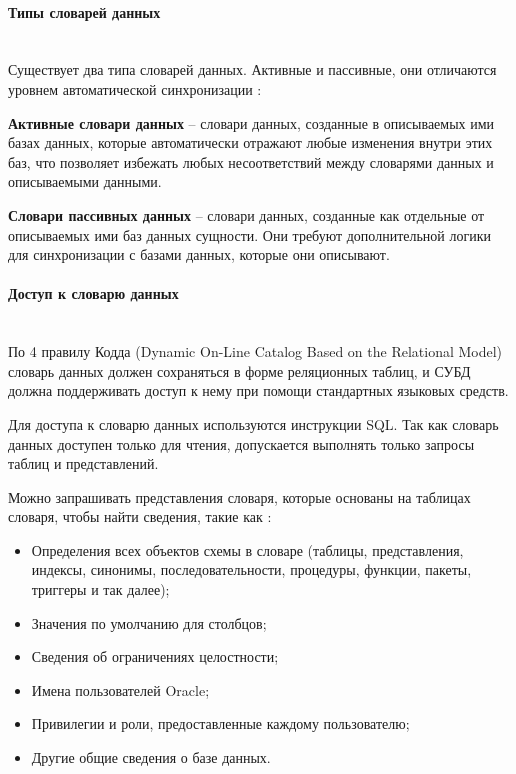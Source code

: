 \paragraph{Типы словарей данных} ~\\

Существует два типа словарей данных. Активные и пассивные, они отличаются уровнем автоматической синхронизации \autocite{DataDictionary}:

\begin{grayquote}
    \textbf{Активные словари данных} -- словари данных, созданные в описываемых ими базах данных, которые автоматически отражают любые изменения внутри этих баз, что позволяет избежать любых несоответствий между словарями данных и описываемыми данными.
\end{grayquote}

\begin{grayquote}
    \textbf{Словари пассивных данных} -- словари данных, созданные как отдельные от описываемых ими баз данных сущности. Они требуют дополнительной логики для синхронизации с базами данных, которые они описывают.
\end{grayquote}

\paragraph{Доступ к словарю данных} ~\\

По 4 правилу Кодда (Dynamic On-Line Catalog Based on the Relational Model) словарь данных должен сохраняться в форме реляционных таблиц, и СУБД должна поддерживать доступ к нему при помощи стандартных языковых средств.


Для доступа к словарю данных используются инструкции SQL. Так как словарь данных доступен только для чтения, допускается выполнять только запросы таблиц и представлений.

Можно запрашивать представления словаря, которые основаны на таблицах словаря, чтобы найти сведения, такие как \autocite{SqlOracle}:
\begin{itemize}
    \item Определения всех объектов схемы в словаре (таблицы, представления, индексы, синонимы, последовательности, процедуры, функции, пакеты, триггеры и так далее);
    \item Значения по умолчанию для столбцов;
    \item Сведения об ограничениях целостности;
    \item Имена пользователей Oracle;
    \item Привилегии и роли, предоставленные каждому пользователю;
    \item Другие общие сведения о базе данных.
\end{itemize}

